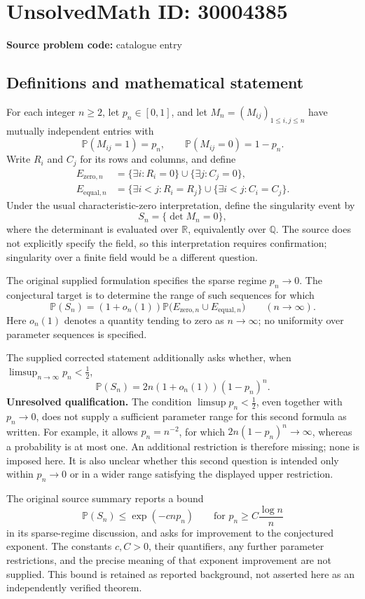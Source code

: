 \documentclass[11pt]{article}
\newcommand{\Q}{\mathbb{Q}}
\newcommand{\R}{\mathbb{R}}
\begin{document}
\section*{UnsolvedMath ID: 30004385}
\textbf{Source problem code:} catalogue entry
\subsection{Definitions and mathematical statement}
For each integer \(n\geq 2\), let \(p_n\in[0,1]\), and let \(M_n=(M_{ij})_{1\leq i,j\leq n}\) have mutually independent entries with
\[
\mathbb P(M_{ij}=1)=p_n,\qquad \mathbb P(M_{ij}=0)=1-p_n.
\]
Write \(R_i\) and \(C_j\) for its rows and columns, and define
\[
\begin{aligned}
E_{\mathrm{zero},n}
&=\{\exists i:R_i=0\}\cup\{\exists j:C_j=0\},\\
E_{\mathrm{equal},n}
&=\{\exists i<j:R_i=R_j\}\cup\{\exists i<j:C_i=C_j\}.
\end{aligned}
\]
Under the usual characteristic-zero interpretation, define the singularity event by
\[
S_n=\{\det M_n=0\},
\]
where the determinant is evaluated over \(\R\), equivalently over \(\Q\). The source does not explicitly specify the field, so this interpretation requires confirmation; singularity over a finite field would be a different question.

The original supplied formulation specifies the sparse regime \(p_n\to0\). The conjectural target is to determine the range of such sequences for which
\[
\mathbb P(S_n)
=(1+o_n(1))\mathbb P\bigl(E_{\mathrm{zero},n}\cup E_{\mathrm{equal},n}\bigr)
\qquad(n\to\infty).
\]
Here \(o_n(1)\) denotes a quantity tending to zero as \(n\to\infty\); no uniformity over parameter sequences is specified.

The supplied corrected statement additionally asks whether, when \(\limsup_{n\to\infty}p_n<\tfrac12\),
\[
\mathbb P(S_n)=2n(1+o_n(1))(1-p_n)^n.
\]
\textbf{Unresolved qualification.} The condition \(\limsup p_n<\tfrac12\), even together with \(p_n\to0\), does not supply a sufficient parameter range for this second formula as written. For example, it allows \(p_n=n^{-2}\), for which \(2n(1-p_n)^n\to\infty\), whereas a probability is at most one. An additional restriction is therefore missing; none is imposed here. It is also unclear whether this second question is intended only within \(p_n\to0\) or in a wider range satisfying the displayed upper restriction.

The original source summary reports a bound
\[
\mathbb P(S_n)\leq\exp(-c n p_n)
\qquad\text{for }p_n\geq C\frac{\log n}{n}
\]
in its sparse-regime discussion, and asks for improvement to the conjectured exponent. The constants \(c,C>0\), their quantifiers, any further parameter restrictions, and the precise meaning of that exponent improvement are not supplied. This bound is retained as reported background, not asserted here as an independently verified theorem.
\end{document}

